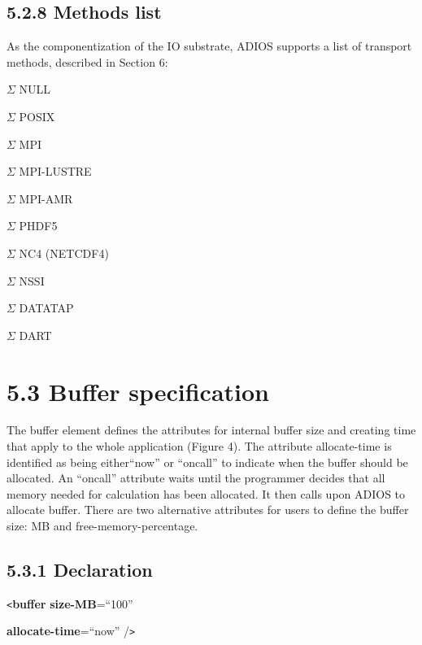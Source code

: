 \subsection*{{\large \textbf{5.2.8 Methods list}}}

\leftskip=0pt
\parindent=0pt
As the componentization of the IO substrate, ADIOS supports a list of transport 
methods, described in Section 6:

\ensuremath{\Sigma} NULL

\ensuremath{\Sigma} POSIX

\ensuremath{\Sigma} MPI

\ensuremath{\Sigma} MPI-LUSTRE

\ensuremath{\Sigma} MPI-AMR

\ensuremath{\Sigma} PHDF5

\ensuremath{\Sigma} NC4 (NETCDF4)

\ensuremath{\Sigma} NSSI

\ensuremath{\Sigma} DATATAP 

\ensuremath{\Sigma} DART\label{HToc82067525}\label{HToc84890252}\label{HToc212016628}\label{HToc212016870}\label{HRef278900114}\label{HToc182553374}

\section*{{\large 5.3 }{\large \textbf{Buffer specification}}}

The buffer element defines the attributes for internal buffer size and creating 
time that apply to the whole application (Figure 4). The attribute allocate-time 
is identified as being either{\small  ``}now'' or ``oncall'' to indicate when the 
buffer should be allocated. An ``oncall'' attribute waits until the programmer 
decides that all memory needed for calculation has been allocated. It then calls 
upon ADIOS to allocate buffer. There are two alternative attributes for users to 
define the buffer size: MB and free-memory-percentage. \label{HToc84890253}\label{HToc212016629}\label{HToc212016871}\label{HToc182553375}

\subsection*{{\large \textbf{5.3.1 Declaration}}}

\texttt{<}\textbf{buffer} \textbf{size-MB}=``100'' 

\leftskip=45pt
\textbf{allocate-time}=``now'' /\texttt{>}

